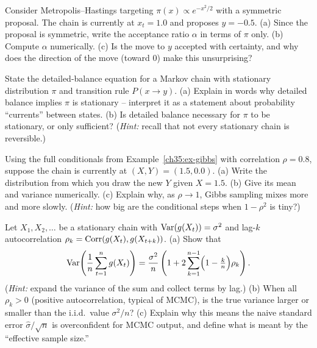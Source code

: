 \begin{exercise}
\label{ch35:exr-mh-ratio}
Consider Metropolis--Hastings targeting $\pi(x) \propto e^{-x^2/2}$ with a
symmetric proposal. The chain is currently at $x_t = 1.0$ and proposes
$y = -0.5$. (a) Since the proposal is symmetric, write the acceptance ratio
$\alpha$ in terms of $\pi$ only. (b) Compute $\alpha$ numerically. (c) Is the
move to $y$ accepted with certainty, and why does the direction of the move
(toward $0$) make this unsurprising?
\end{exercise}

\begin{exercise}
\label{ch35:exr-detailed-balance}
State the detailed-balance equation for a Markov chain with stationary
distribution $\pi$ and transition rule $P(x\to y)$. (a) Explain in words why
detailed balance implies $\pi$ is stationary -- interpret it as a statement about
probability ``currents'' between states. (b) Is detailed balance necessary for
$\pi$ to be stationary, or only sufficient? (\emph{Hint:} recall that not every
stationary chain is reversible.)
\end{exercise}

\begin{exercise}
\label{ch35:exr-gibbs}
Using the full conditionals from Example~\ref{ch35:ex-gibbs} with correlation
$\rho = 0.8$, suppose the chain is currently at $(X, Y) = (1.5, 0.0)$. (a) Write
the distribution from which you draw the new $Y$ given $X = 1.5$. (b) Give its
mean and variance numerically. (c) Explain why, as $\rho \to 1$, Gibbs sampling
mixes more and more slowly. (\emph{Hint:} how big are the conditional steps when
$1-\rho^2$ is tiny?)
\end{exercise}

\begin{exercise}
\label{ch35:exr-diagnose}
Let $X_1, X_2, \dots$ be a stationary chain with $\operatorname{Var}(g(X_t)) = \sigma^2$ and
lag-$k$ autocorrelation $\rho_k = \operatorname{Corr}(g(X_t), g(X_{t+k}))$. (a) Show that
\[
  \operatorname{Var}\!\left(\frac1n\sum_{t=1}^n g(X_t)\right)
  = \frac{\sigma^2}{n}\left(1 + 2\sum_{k=1}^{n-1}\Bigl(1 - \tfrac{k}{n}\Bigr)\rho_k\right).
\]
(\emph{Hint:} expand the variance of the sum and collect terms by lag.) (b) When
all $\rho_k > 0$ (positive autocorrelation, typical of MCMC), is the true variance
larger or smaller than the i.i.d.\ value $\sigma^2/n$? (c) Explain why this means
the naive standard error $\hat\sigma/\sqrt n$ is overconfident for MCMC output,
and define what is meant by the ``effective sample size.''
\end{exercise}

